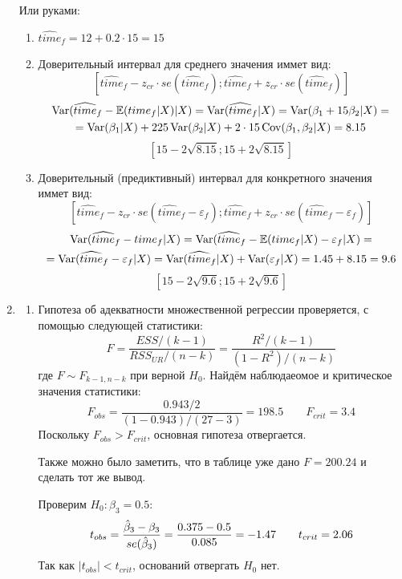 \documentclass[12pt, a4paper]{article}\usepackage[]{graphicx}\usepackage[]{color}
\begin{document}
\begin{enumerate}
Или руками:
\begin{enumerate}
\item $\widehat{time}_f = 12 + 0.2 \cdot 15 = 15$
\item Доверительный интервал для среднего значения иммет вид:
\[
[\widehat{time}_f - z_{cr} \cdot se(\widehat{time}_f); \widehat{time}_f + z_{cr} \cdot se(\widehat{time}_f)]
\]
\begin{multline*}
\operatorname{Var}(\widehat{time}_f - \mathbb{E}(time_f | X)|X) = \operatorname{Var}(\widehat{time}_f|X) = \operatorname{Var}(\beta_1 + 15\beta_2 | X) = \\
= \operatorname{Var}(\beta_1|X) + 225 \operatorname{Var}(\beta_2|X) + 2 \cdot 15 \operatorname{Cov}(\beta_1, \beta_2|X) = 8.15 \\
\end{multline*}
\[
[15 - 2 \sqrt{8.15}; 15 + 2 \sqrt{8.15} ]
\]
\item Доверительный (предиктивный) интервал для конкретного значения иммет вид:
\[
[\widehat{time}_f - z_{cr} \cdot se(\widehat{time}_f - \varepsilon_f); \widehat{time}_f+ z_{cr} \cdot se(\widehat{time}_f - \varepsilon_f)]
\]
\begin{multline*}
\operatorname{Var}(\widehat{time}_f - time_f | X) = \operatorname{Var}(\widehat{time}_f - \mathbb{E}(time_f | X) - \varepsilon_f |X) = \\
= \operatorname{Var}(\widehat{time}_f - \varepsilon_f |X) = \operatorname{Var}(\widehat{time}_f|X) + \operatorname{Var}(\varepsilon_f |X) = 1.45 + 8.15 = 9.6
\end{multline*}
\[
[15 - 2 \sqrt{9.6}; 15 + 2 \sqrt{9.6}]
\]
\end{enumerate}
\item
\begin{enumerate}
\item Гипотеза об адекватности множественной регрессии проверяется, с помощью следующей статистики:
\[
F = \frac{ESS/(k-1)}{RSS_{UR} / (n-k)} = \frac{R^2/(k-1)}{(1-R^2)/(n-k)}
\]
где $F \sim F_{k-1, n-k}$ при верной $H_0$. Найдём наблюдаеомое и критическое значения статистики:
\[
F_{obs} = \frac{0.943/2}{(1-0.943)/(27-3)} = 198.5 \quad \quad F_{crit} = 3.4
\]
Поскольку $F_{obs} > F_{crit}$, основная гипотеза отвергается.

Также можно было заметить, что в таблице уже дано $F = 200.24$ и сделать тот же вывод.

Проверим $H_0: \beta_3 = 0.5$:
\[
t_{obs} = \frac{\hat{\beta}_3 - \beta_3}{se(\hat{\beta}_3)} = \frac{0.375 - 0.5}{0.085} = -1.47 \quad \quad t_{crit} = 2.06
\]
Так как $|t_{obs}| < t_{crit}$, оснований отвергать $H_0$ нет.


\end{enumerate}
\end{enumerate}
\end{document}
